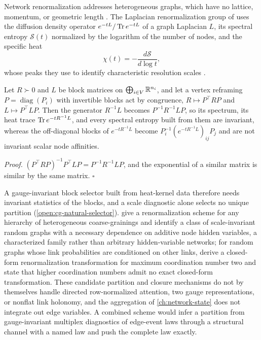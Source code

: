 Network renormalization addresses heterogeneous graphs, which have no lattice,
momentum, or geometric length \citep{gabrielli2025network}. The Laplacian
renormalization group of \citet{villegas2023laplacian} uses the diffusion
density operator \(e^{-tL}/\operatorname{Tr} e^{-tL}\) of a graph Laplacian \(L\), its
spectral entropy \(\mathcal S(t)\) normalized by the logarithm of the number of
nodes, and the specific heat
\begin{equation}
\chi(t)=-\frac{d\mathcal S}{d\log t},
\label{eq:grg-heat-capacity}
\end{equation}
whose peaks they use to identify characteristic resolution scales
\citep[arXiv version, Eqs.~(1), (2), and~(5)]{villegas2023laplacian}.

Let \(R\succ0\) and \(L\) be block matrices on \(\bigoplus_{i\in V}\mathbb R^{n_i}\), and
let a vertex reframing \(P=\operatorname{diag}(P_i)\) with invertible blocks
act by congruence, \(R\mapsto P^\top RP\) and \(L\mapsto P^\top LP\). Then the
generator \(R^{-1}L\) becomes \(P^{-1}R^{-1}LP\), so its spectrum, its heat trace
\(\operatorname{Tr} e^{-tR^{-1}L}\), and every spectral entropy built from them are invariant,
whereas the off-diagonal blocks of \(e^{-tR^{-1}L}\) become
\(P_i^{-1}(e^{-tR^{-1}L})_{ij}P_j\) and are not invariant scalar node affinities.

\noindent\emph{Proof.}
\((P^\top RP)^{-1}P^\top LP=P^{-1}R^{-1}LP\), and the exponential of a similar
matrix is similar by the same matrix. \(\square\)

A gauge-invariant block selector built from heat-kernel data therefore needs
invariant statistics of the blocks, and a scale diagnostic alone selects no
unique partition (\cref{open:cg-natural-selector}).
\citet{Garuccio2023Multiscale} give a renormalization scheme for any hierarchy
of heterogeneous coarse-grainings and identify a class of scale-invariant random
graphs with a necessary dependence on additive node hidden variables, a
characterized family rather than arbitrary hidden-variable networks; for random
graphs whose link probabilities are conditioned on other links,
\citet{CatanzaroGarlaschelliPatil2026} derive a closed-form renormalization
transformation for maximum coordination number two and state that higher
coordination numbers admit no exact closed-form transformation. These candidate partition and closure
mechanisms do not by themselves handle directed row-normalized attention, two
gauge representations, or nonflat link holonomy, and the aggregation of
\cref{ch:network-state} does not integrate out edge variables. A combined scheme
would infer a partition from gauge-invariant multiplex diagnostics of edge-event
laws through a structural channel with a named law and push the complete law
exactly.

